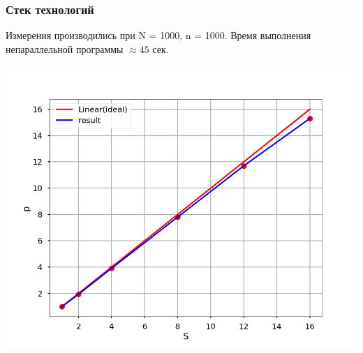 \documentclass[pdf, hyperref={unicode}, aspectratio=169]{beamer}
\begin{document}
\begin{frame}
\frametitle{Стек технологий}


Измерения производились при N = 1000, n = 1000.
Время выполнения непараллельной программы $\approx 45$ сек.

\centering
\includegraphics[scale=0.3]{images/speedup.png}

\end{frame}
\end{document}
